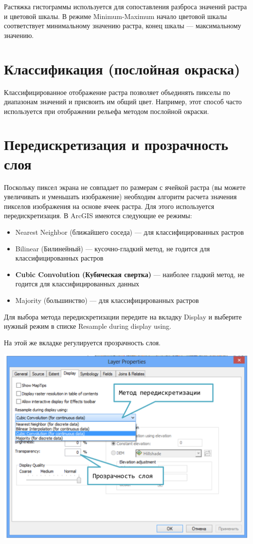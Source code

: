 \documentclass[12pt,]{book}
\begin{document}
Растяжка гистограммы используется для сопоставления разброса значений растра и цветовой шкалы. В режиме Minimum-Maximum начало цветовой шкалы соответствует минимальному значению растра, конец шкалы --- максимальному значению.

\hypertarget{section-22}{%
\section{Классификация (послойная окраска)}\label{section-22}}

Классифицированное отображение растра позволяет объединять пикселы по диапазонам значений и присвоить им общий цвет. Например, этот способ часто используется при отображении рельефа методом послойной окраски.

\hypertarget{section-23}{%
\section{Передискретизация и прозрачность слоя}\label{section-23}}

Поскольку пиксел экрана не совпадает по размерам с ячейкой растра (вы можете увеличивать и уменьшать изображение) необходим алгоритм расчета значения пикселов изображения на основе ячеек растра. Для этого используется передискретизация. В ArcGIS имеются следующие ее режимы:

\begin{itemize}
\item
  Nearest Neighbor (ближайшего соседа) --- для классифицированных растров
\item
  Bilinear (Билинейный) --- кусочно-гладкий метод, не годится для классифицированных растров
\item
  \textbf{Cubic Convolution (Кубическая свертка)} --- наиболее гладкий метод, не годится для классифицированных данных
\item
  Majority (большинство) --- для классифицированных растров
\end{itemize}

Для выбора метода передискретизации передите на вкладку Display и выберите нужный режим в списке Resample during display using.

На этой же вкладке регулируется прозрачность слоя.

\includegraphics{images/Appendix/image38.png}
\end{document}
